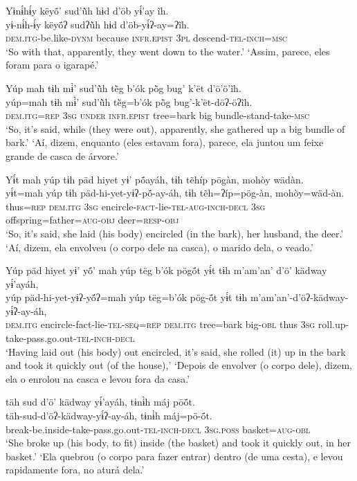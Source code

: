 \documentclass[output=paper,
modfonts,nonflat
]{langsci/langscibook}
\begin{document}
\ea  Yɨnɨ́hɨ́y këyö́’ sud’ũ̀h hɨd d’öb yɨ́’ay ĩh.\\
\gll yɨ-nɨ́h-ɨ́y këyö́ʔ sudʔũ̀h hɨd d’öb-yɨ́ʔ-ay=ʔĩh.\\
     \textsc{dem.itg-}be.like\textsc{-dynm} because \textsc{infr.epist} \textsc{3pl} descend\textsc{-tel-inch=msc}\\
\glt ‘So with that, apparently, they went down to the water.'
\glt ‘Assim, parece, eles foram para o igarapé.'
\z 

\ea  Yúp mah tɨh mɨ̀’ sud’ũ̀h të̀g b’ók pö̀g bug’ k’ët d’ö’ö’ĩh.\\
\gll yúp=mah tɨh mɨ̀’ sud’ũ̀h të̀g=b’ók pö̀g bug’-k’ët-döʔ-öʔĩh.\\
     \textsc{dem.itg=rep} \textsc{3sg} \textsc{under} \textsc{infr.epist} tree=bark big bundle-stand-take\textsc{-msc}\\
\glt ‘So, it’s said, while (they were out), apparently, she gathered up a big bundle of bark.'
\glt ‘Aí, dizem, enquanto (eles estavam fora), parece, ela juntou um feixe grande de casca de árvore.'
\z 

\newpage
\ea  Yɨ́t mah yúp tɨh päd hiyet yɨ’ pö́ayáh, tɨh tẽhíp pögàn, mohòy wädàn.\\
\gll yɨ́t=mah yúp tɨh päd-hi-yet-yɨʔ-pö́-ay-áh, tɨh tẽh=ʔíp=pög-àn, mohòy=wäd-àn.\\
     thus\textsc{=rep} \textsc{dem.itg} \textsc{3sg} encircle-\textsc{fact}-lie\textsc{-tel-aug-inch-decl} \textsc{3sg} offspring=father\textsc{=aug-obj} deer\textsc{=resp-obj}\\
\glt ‘So, it’s said, she laid (his body) encircled (in the bark), her husband, the deer.'
\glt ‘Aí, dizem, ela envolveu (o corpo dele na casca), o marido dela, o veado.'
\z 

\ea  Yúp päd hiyet yɨ’ yö́’ mah yúp tëg b’ók pögö́t yɨ́t tɨh m’am’an’ d’ö’ kädway yɨ́’ayáh,\\
\gll yúp päd-hi-yet-yɨʔ-yö́ʔ=mah yúp tëg=b’ók pög-ö́t yɨ́t tɨh m’am’an’-d’öʔ-kädway-yɨ́ʔ-ay-áh,\\
     \textsc{dem.itg} encircle-fact-lie\textsc{-tel-seq=rep} \textsc{dem.itg} tree=bark big\textsc{-obl} thus \textsc{3sg} roll.up-take-pass.go.out\textsc{-tel-inch-decl}\\
\glt ‘Having laid out (his body) out encircled, it’s said, she rolled (it) up in the bark and took it quickly out (of the house),'
\glt ‘Depois de envolver (o corpo dele), dizem, ela o enrolou na casca e levou fora da casa.'
\z 

\ea  täh sud d’ö’ kädway yɨ́’ayáh, tɨnɨ̀h máj pöö́t.\\
\gll täh-sud-d’öʔ-kädway-yɨ́ʔ-ay-áh, tɨnɨ̀h máj=pö-ö́t.\\
     break-be.inside-take-pass.go.out\textsc{-tel-inch-decl} \textsc{3sg.poss} basket\textsc{=aug-obl}\\
\glt ‘She broke up (his body, to fit) inside (the basket) and took it quickly out, in her basket.'
\glt ‘Ela quebrou (o corpo para fazer entrar) dentro (de uma cesta), e levou rapidamente fora, no aturá dela.'
\z 
\end{document}
